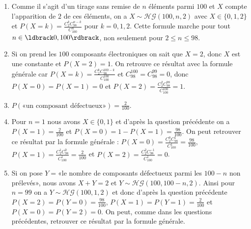 \documentclass[a4paper,11pt,reqno]{amsart}
\begin{document}
\begin{solution}
  \begin{enumerate}
    \item Comme il s'agit d'un tirage sans remise de $n$ éléments parmi $100$ et $X$ compte l'apparition de $2$ de ces éléments, on a $X \sim \mathcal{HG}(100,n,2)$ avec $X \in \{0,1,2\}$ et $P(X=k) = \frac{C_{2}^{k}C_{98}^{n-k}}{C_{100}^{n}}$ pour $k=0,1,2$. Cette formule marche pour tout $n \in \ldbrack 0,100 \rdbrack$, non seulement pour $2 \leq n \leq 98$.
    \item Si on prend les $100$ composants électroniques on sait que $X=2$, donc $X$ est une constante et $P(X=2)=1$. On retrouve ce résultat avec la formule générale car $P(X=k) = \frac{C_{2}^{k}C_{98}^{100-k}}{C_{100}^{100}}$ et $C_{98}^{100}=C_{98}^{99}=0$, donc $P(X=0)=P(X=1)=0$ et $P(X=2) = \frac{C_{2}^{2}C_{98}^{98}}{C_{100}^{100}}=1$.
    \item $P(\text{«un composant défectueux»}) = \frac{2}{100}$.
    \item Pour $n=1$ nous avons $X \in \{0,1\}$ et d'après la question précédente on a $P(X=1)=\frac{2}{100}$ et $P(X=0)=1-P(X=1)=\frac{98}{100}$. On peut retrouver ce résultat par la formule générale : $P(X=0) = \frac{C_{2}^{0}C_{98}^{1}}{C_{100}^{1}} = \frac{98}{100}$, $P(X=1) = \frac{C_{2}^{1}C_{98}^{0}}{C_{100}^{1}} = \frac{2}{100}$ et $P(X=2) = \frac{C_{2}^{2}C_{98}^{-1}}{C_{100}^{1}} = 0$.
    \item Si on pose $Y=$«le nombre de composants défectueux parmi les $100-n$ non prélevés», nous avons $X+Y=2$ et $Y \sim \mathcal{HG}(100,100-n,2)$. Ainsi pour $n=99$ on a $Y \sim \mathcal{HG}(100,1,2)$ et donc d'après la question précédente $P(X=2)=P(Y=0)=\frac{98}{100}$, $P(X=1)=P(Y=1)=\frac{2}{100}$ et $P(X=0)=P(Y=2)=0$. On peut, comme dans les questions précédentes, retrouver ce résultat par la formule générale.
  \end{enumerate}
\end{solution}
\end{document}
